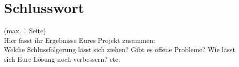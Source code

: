 \documentclass[paper=A4, deutsch]{scrartcl}
\begin{document}
\section{Schlusswort}
(max. 1 Seite)\\
Hier fasst ihr Ergebnisse Eures Projekt zusammen:\\
Welche Schlussfolgerung lässt sich ziehen? Gibt es offene Probleme? Wie lässt sich Eure Lösung noch verbessern? etc.



\end{document}
